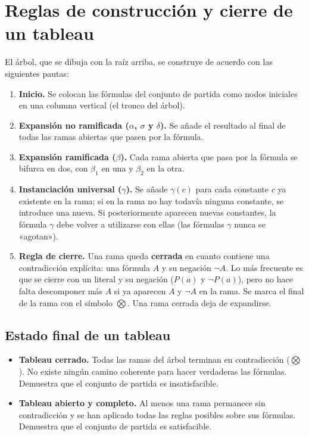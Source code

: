 \section{Reglas de construcción y cierre de un tableau}\label{sec:reglas-tableau}

El árbol, que se dibuja con la raíz arriba, se construye de acuerdo con las siguientes pautas:

\begin{enumerate}
    \item \textbf{Inicio.} Se colocan las fórmulas del conjunto de partida como nodos iniciales en una columna vertical (el tronco del árbol).
    \item \textbf{Expansión no ramificada ($\alpha$, $\sigma$ y $\delta$).} Se añade el resultado al final de todas las ramas abiertas que pasen por la fórmula.
    \item \textbf{Expansión ramificada ($\beta$).} Cada rama abierta que pasa por la fórmula se bifurca en dos, con $\beta_1$ en una y $\beta_2$ en la otra.
    \item \textbf{Instanciación universal ($\gamma$).} Se añade $\gamma(c)$ para cada constante $c$ ya existente en la rama; si en la rama no hay todavía ninguna constante, se introduce una nueva. Si posteriormente aparecen nuevas constantes, la fórmula $\gamma$ debe volver a utilizarse con ellas (las fórmulas $\gamma$ nunca se «agotan»).
    \item \textbf{Regla de cierre.} Una rama queda \textbf{cerrada} en cuanto contiene una contradicción explícita: una fórmula $A$ y su negación $\neg A$. Lo más frecuente es que se cierre con un literal y su negación ($P(a)$ y $\neg P(a)$), pero no hace falta descomponer más $A$ si ya aparecen $A$ y $\neg A$ en la rama. Se marca el final de la rama con el símbolo $\bigotimes$. Una rama cerrada deja de expandirse.
\end{enumerate}

\subsection{Estado final de un tableau}
\begin{itemize}
    \item \textbf{Tableau cerrado.} Todas las ramas del árbol terminan en contradicción ($\bigotimes$). No existe ningún camino coherente para hacer verdaderas las fórmulas. Demuestra que el conjunto de partida es insatisfacible.
    \item \textbf{Tableau abierto y completo.} Al menos una rama permanece sin contradicción y se han aplicado todas las reglas posibles sobre sus fórmulas. Demuestra que el conjunto de partida es satisfacible.
\end{itemize}

